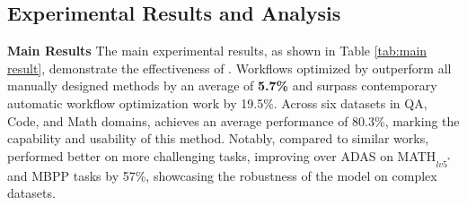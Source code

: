 \subsection{Experimental Results and Analysis}

\noindent\textbf{Main Results} The main experimental results, as shown in Table \ref{tab:main result}, demonstrate the effectiveness of \model. Workflows optimized by \model outperform all manually designed methods by an average of \textbf{5.7\%} and surpass contemporary automatic workflow optimization work by 19.5\%. Across six datasets in QA, Code, and Math domains, \model achieves an average performance of 80.3\%, marking the capability and usability of this method. Notably, compared to similar works, \model performed better on more challenging tasks, improving over ADAS on MATH$_{lv5^*}$ and MBPP tasks by 57\%, showcasing the robustness of the model on complex datasets.

\vspace{-5mm}


